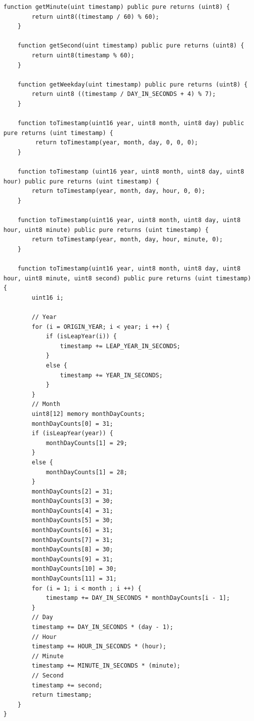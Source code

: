 \documentclass[a4paper]{article}
\begin{document}
\begin{frame}
\begin{lstlisting}[basicstyle=\small]
    function getMinute(uint timestamp) public pure returns (uint8) {
        return uint8((timestamp / 60) % 60);
    }
    
    function getSecond(uint timestamp) public pure returns (uint8) {
        return uint8(timestamp % 60);
    }
    
    function getWeekday(uint timestamp) public pure returns (uint8) {
        return uint8 ((timestamp / DAY_IN_SECONDS + 4) % 7);
    }
    
    function toTimestamp(uint16 year, uint8 month, uint8 day) public pure returns (uint timestamp) {
         return toTimestamp(year, month, day, 0, 0, 0);
    }
    
    function toTimestamp (uint16 year, uint8 month, uint8 day, uint8 hour) public pure returns (uint timestamp) {
        return toTimestamp(year, month, day, hour, 0, 0);
    }
    
    function toTimestamp(uint16 year, uint8 month, uint8 day, uint8 hour, uint8 minute) public pure returns (uint timestamp) {
        return toTimestamp(year, month, day, hour, minute, 0);
    }
    
    function toTimestamp(uint16 year, uint8 month, uint8 day, uint8 hour, uint8 minute, uint8 second) public pure returns (uint timestamp) {
        uint16 i;

        // Year
        for (i = ORIGIN_YEAR; i < year; i ++) {
            if (isLeapYear(i)) {
                timestamp += LEAP_YEAR_IN_SECONDS;
            }
            else {
                timestamp += YEAR_IN_SECONDS;
            }
        }
        // Month
        uint8[12] memory monthDayCounts;
        monthDayCounts[0] = 31;
        if (isLeapYear(year)) {
            monthDayCounts[1] = 29;
        }
        else {
            monthDayCounts[1] = 28;
        }
        monthDayCounts[2] = 31;
        monthDayCounts[3] = 30;
        monthDayCounts[4] = 31;
        monthDayCounts[5] = 30;
        monthDayCounts[6] = 31;
        monthDayCounts[7] = 31;
        monthDayCounts[8] = 30;
        monthDayCounts[9] = 31;
        monthDayCounts[10] = 30;
        monthDayCounts[11] = 31;
        for (i = 1; i < month ; i ++) {
            timestamp += DAY_IN_SECONDS * monthDayCounts[i - 1];
        }
        // Day
        timestamp += DAY_IN_SECONDS * (day - 1);
        // Hour
        timestamp += HOUR_IN_SECONDS * (hour);
        // Minute
        timestamp += MINUTE_IN_SECONDS * (minute);
        // Second
        timestamp += second;
        return timestamp;
    }
}
\end{lstlisting}
\end{frame}
\end{document}
